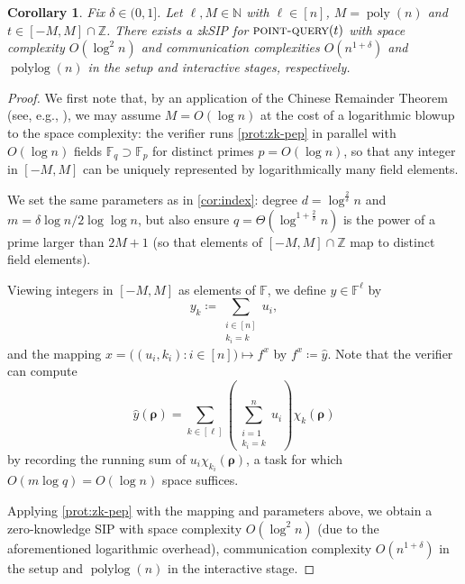 \documentclass[a4paper,UKenglish,cleveref, autoref, thm-restate]{lipics-v2021}
\newtheorem{corollary}[theorem]{Corollary}
\theoremstyle{definition}
\newcommand{\zksip}{\textrm{zkSIP}}
\newcommand{\N}{\mathbb N}
\newcommand{\Z}{\mathbb Z}
\newcommand{\field}{\mathbb{F}}
\newcommand{\poly}{\operatorname{poly}}
\newcommand{\polylog}{\operatorname{polylog}}
\newcommand{\pointquery}{\normalfont\textsc{point-query}\xspace}
\newcommand{\dimension}{m}
\newcommand{\degree}{d}
\newcommand{\fieldsize}{q}
\newcommand{\fingerprinttuple}{\bm{\rho}}
\begin{document}
\begin{corollary}
    \label{cor:point-query}
    Fix $\delta \in (0,1]$. Let $\ell, M \in \N$ with $\ell \in [n]$, $M = \poly(n)$ and $t \in [-M, M] \cap \Z$. There exists a \zksip{} for $\pointquery(t)$ with space complexity $O(\log^2 n)$ and communication complexities $O(n^{1 + \delta})$ and $\polylog(n)$ in the setup and interactive stages, respectively. 
\end{corollary}
\begin{proof}
    We first note that, by an application of the Chinese Remainder Theorem (see, e.g., \cite{GR15}), we may assume $M = O(\log n)$ at the cost of a logarithmic blowup to the space complexity: the verifier runs \cref{prot:zk-pep} in parallel with $O(\log n)$ fields $\field_\fieldsize \supset \field_p$ for distinct primes $p = O(\log n)$, so that any integer in $[-M, M]$ can be uniquely represented by logarithmically many field elements.
    
    We set the same parameters as in \cref{cor:index}: degree $\degree = \log^{\frac{2}{\delta}} n$ and $\dimension = \delta \log n / 2\log\log n$, but also ensure $\fieldsize = \Theta\left(\log^{1 + \frac{2}{\delta}} n\right)$ is the power of a prime larger than $2M + 1$ (so that elements of $[-M,M] \cap \Z$ map to distinct field elements).
    
    Viewing integers in $[-M,M]$ as elements of $\field$, we define $y \in \field^\ell$ by
    \begin{equation*}
        y_k \coloneqq \sum_{\substack{i \in [n]\\k_i = k}} u_i,
    \end{equation*}
    and the mapping $x = \big((u_i, k_i) : i \in [n]\big) \mapsto f^x$ by $f^x \coloneqq \hat y$. Note that the verifier can compute
    \begin{equation*}
        \hat y(\fingerprinttuple) = \sum_{k \in [\ell]} \left(\sum_{\substack{i = 1\\k_i = k}}^n u_i\right) \chi_k(\fingerprinttuple)
    \end{equation*}
    by recording the running sum of $u_i \chi_{k_i}(\fingerprinttuple)$, a task for which $O(\dimension \log \fieldsize) = O(\log n)$ space suffices.
    
    Applying \cref{prot:zk-pep} with the mapping and parameters above, we obtain a zero-knowledge SIP with space complexity $O(\log^2 n)$ (due to the aforementioned logarithmic overhead), communication complexity $O(n^{1 + \delta})$ in the setup and $\polylog(n)$ in the interactive stage.
\end{proof}
\end{document}
